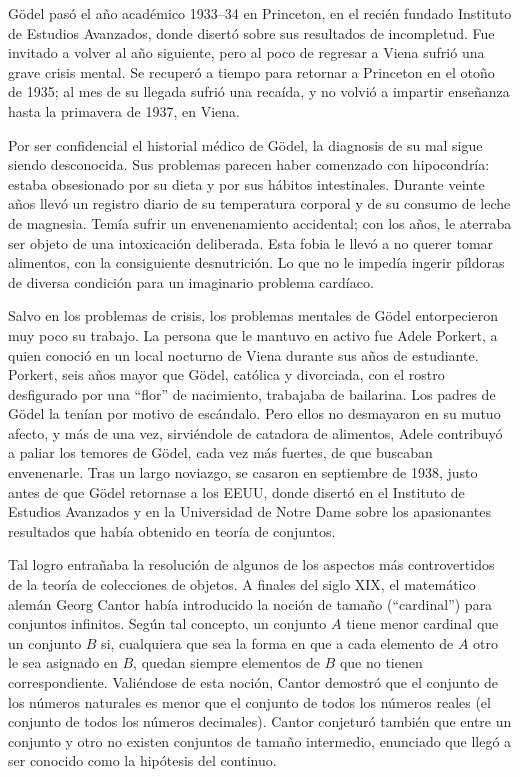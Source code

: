 \documentclass[a4paper, 12pt]{article}
\begin{document}
Gödel pasó el año académico 1933--34 en Princeton, en el recién fundado Instituto de Estudios Avanzados, donde disertó sobre sus resultados de incompletud. Fue invitado a volver al año siguiente, pero al poco de regresar a Viena sufrió una grave crisis mental. Se recuperó a tiempo para retornar a Princeton en el otoño de 1935; al mes de su llegada sufrió una recaída, y no volvió a impartir enseñanza hasta la primavera de 1937, en Viena.

Por ser confidencial el historial médico de Gödel, la diagnosis de su mal sigue siendo desconocida. Sus problemas parecen haber comenzado con hipocondría: estaba obsesionado por su dieta y por sus hábitos intestinales. Durante veinte años llevó un registro diario de su temperatura corporal y de su consumo de leche de magnesia. Temía sufrir un envenenamiento accidental; con los años, le aterraba ser objeto de una intoxicación deliberada. Esta fobia le llevó a no querer tomar alimentos, con la consiguiente desnutrición. Lo que no le impedía ingerir píldoras de diversa condición para un imaginario problema cardíaco.

Salvo en los problemas de crisis, los problemas mentales de Gödel entorpecieron muy poco su trabajo. La persona que le mantuvo en activo fue Adele Porkert, a quien conoció en un local nocturno de Viena durante sus años de estudiante. Porkert, seis años mayor que Gödel, católica y divorciada, con el rostro desfigurado por una ``flor'' de nacimiento, trabajaba de bailarina. Los padres de Gödel la tenían por motivo de escándalo. Pero ellos no desmayaron en su mutuo afecto, y más de una vez, sirviéndole de catadora de alimentos, Adele contribuyó a paliar los temores de Gödel, cada vez más fuertes, de que buscaban envenenarle. Tras un largo noviazgo, se casaron en septiembre de 1938, justo antes de que Gödel retornase a los EEUU, donde disertó en el Instituto de Estudios Avanzados y en la Universidad de Notre Dame sobre los apasionantes resultados que había obtenido en teoría de conjuntos.

Tal logro entrañaba la resolución de algunos de los aspectos más controvertidos de la teoría de colecciones de objetos. A finales del siglo XIX, el matemático alemán Georg Cantor había introducido la noción de tamaño (``cardinal'') para conjuntos infinitos. Según tal concepto, un conjunto $A$ tiene menor cardinal que un conjunto $B$ si, cualquiera que sea la forma en que a cada elemento de $A$ otro le sea asignado en $B$, quedan siempre elementos de $B$ que no tienen correspondiente. Valiéndose de esta noción, Cantor demostró que el conjunto de los números naturales es menor que el conjunto de todos los números reales (el conjunto de todos los números decimales). Cantor conjeturó también que entre un conjunto y otro no existen conjuntos de tamaño intermedio, enunciado que llegó a ser conocido como la hipótesis del continuo.
\end{document}
